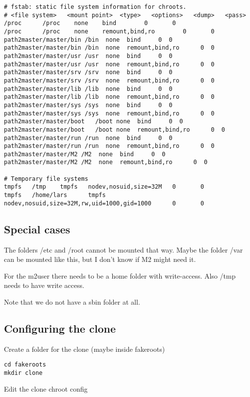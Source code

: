 \documentclass[a4paper]{article}
\begin{document}
\begin{verbatim}
# fstab: static file system information for chroots.
# <file system>   <mount point>  <type>   <options>   <dump>   <pass>
/proc      /proc    none    bind        0       0
/proc      /proc    none    remount,bind,ro        0       0
path2master/master/bin /bin  none  bind     0  0
path2master/master/bin /bin  none  remount,bind,ro      0  0
path2master/master/usr /usr  none  bind     0  0
path2master/master/usr /usr  none  remount,bind,ro      0  0
path2master/master/srv /srv  none  bind     0  0
path2master/master/srv /srv  none  remount,bind,ro      0  0
path2master/master/lib /lib  none  bind     0  0
path2master/master/lib /lib  none  remount,bind,ro      0  0
path2master/master/sys /sys  none  bind     0  0
path2master/master/sys /sys  none  remount,bind,ro      0  0
path2master/master/boot   /boot none  bind     0  0
path2master/master/boot   /boot none  remount,bind,ro      0  0
path2master/master/run /run  none  bind     0  0
path2master/master/run /run  none  remount,bind,ro      0  0
path2master/master/M2 /M2  none  bind     0  0
path2master/master/M2 /M2  none  remount,bind,ro      0  0

# Temporary file systems
tmpfs   /tmp    tmpfs   nodev,nosuid,size=32M   0       0
tmpfs   /home/lars      tmpfs   nodev,nosuid,size=32M,rw,uid=1000,gid=1000      0       0
\end{verbatim}

\subsection{Special cases}
The folders /etc and /root cannot be mounted that way. Maybe the folder /var can be mounted like this, but I don't know if M2 might need it.

For the m2user there needs to be a home folder with write-access. Also /tmp needs to have write access.

Note that we do not have a sbin folder at all.
\subsection{Configuring the clone}

Create a folder for the clone (maybe inside fakeroots)

\begin{verbatim}
cd fakeroots
mkdir clone
\end{verbatim}

Edit the clone chroot config
\end{document}
